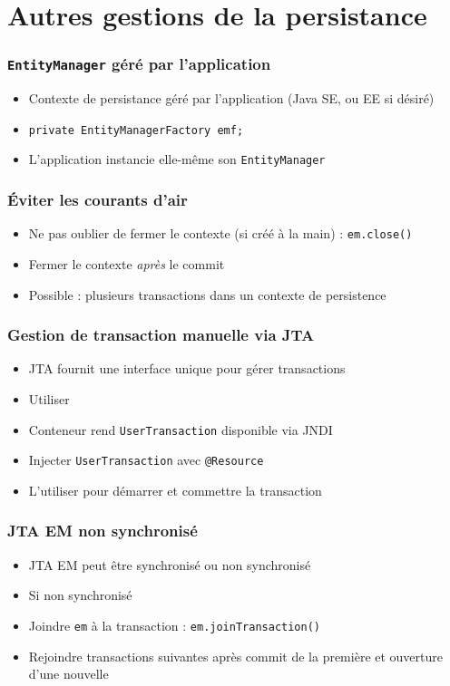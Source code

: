 \documentclass[english, french]{beamer}
\begin{document}
\section{Autres gestions de la persistance}
\begin{frame}
	\frametitle{\texttt{EntityManager} géré par l’application}
	\begin{itemize}
		\item Contexte de persistance géré par l’application (Java SE, ou EE si désiré)
		\item {} \texttt{private EntityManagerFactory emf;}
		\item L’application instancie elle-même son \texttt{EntityManager}
	\end{itemize}
\end{frame}

\begin{frame}
	\frametitle{Éviter les courants d’air}
	\begin{itemize}
		\item Ne pas oublier de fermer le contexte (si créé à la main) : \texttt{em.close()}
		\item Fermer le contexte \emph{après} le commit
		\item Possible : plusieurs transactions dans un contexte de persistence
	\end{itemize}
\end{frame}

\begin{frame}
	\frametitle{Gestion de transaction manuelle via JTA}
	\begin{itemize}
		\item JTA fournit une interface unique pour gérer transactions
		\item Utiliser 
		\item Conteneur rend \texttt{UserTransaction} disponible via JNDI
		\item Injecter \texttt{UserTransaction} avec \texttt{@Resource}
		\item L’utiliser pour démarrer et commettre la transaction
	\end{itemize}
\end{frame}

\begin{frame}
	\frametitle{JTA EM non synchronisé}
	\begin{itemize}
		\item JTA EM peut être synchronisé ou non synchronisé
		\item Si non synchronisé
		\item Joindre \texttt{em} à la transaction : \texttt{em.joinTransaction()}
		\item Rejoindre transactions suivantes après commit de la première et ouverture d’une nouvelle
	\end{itemize}
\end{frame}
\end{document}
